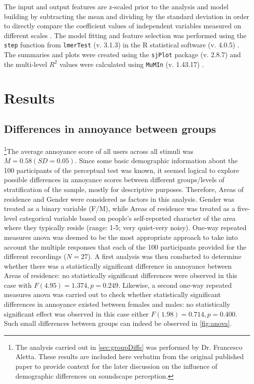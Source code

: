 The input and output features are z-scaled prior to the analysis and model building by subtracting the mean and dividing by the standard deviation in order to directly compare the coefficient values of independent variables measured on different scales \citep{Harrison2018brief}. The model fitting and feature selection was performed using the \texttt{step} function from \texttt{lmerTest} (v. 3.1.3) \citep{Kuznetsova2017lmerTest} in the R statistical software (v. 4.0.5) \citep{RCT2018R}. The summaries and plots were created using the \texttt{sjPlot} package (v. 2.8.7) \citep{Luedecke2021sjPlot} and the multi-level $R^2$ values were calculated using \texttt{MuMIn} (v. 1.43.17) \citep{Barton2020MuMIN}.


\section{Results}

\subsection{Differences in annoyance between groups \label{sec:groupDiffs}}

\footnote{The analysis carried out in \cref{sec:groupDiffs} was performed by Dr. Francesco Aletta. These results are included here verbatim from the original published paper to provide context for the later discussion on the influence of demographic differences on soundscape perception.}The average annoyance score of all users across all stimuli was $M=0.58 (SD=0.05)$. Since some basic demographic information about the 100 participants of the perceptual test was known, it seemed logical to explore possible differences in annoyance scores between different groups/levels of stratification of the sample, mostly for descriptive purposes. Therefore, Areas of residence and Gender were considered as factors in this analysis. Gender was treated as a binary variable (F/M), while Areas of residence was treated as a five-level categorical variable based on people's self-reported character of the area where they typically reside (range: 1-5; very quiet-very noisy). One-way repeated measures \gls{anova} was deemed to be the most appropriate approach to take into account the multiple responses that each of the 100 participants provided for the different recordings ($N=27$). A first analysis was then conducted to determine whether there was a statistically significant difference in annoyance between Areas of residence: no statistically significant differences were observed in this case with $F(4.95)=1.374, p=0.249$. Likewise, a second one-way repeated measures \gls{anova} was carried out to check whether statistically significant differences in annoyance existed between females and males: no statistically significant effect was observed in this case either $F(1.98)=0.714, p=0.400$. Such small differences between groups can indeed be observed in \cref{fig:anova}.

